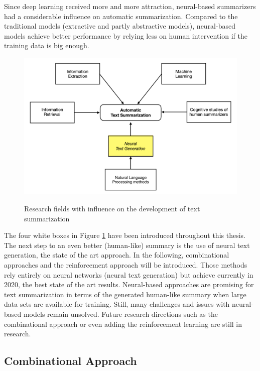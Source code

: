 Since deep learning received more and more attraction, neural-based summarizers had a considerable influence on automatic summarization. Compared to the traditional models (extractive and partly abstractive models), neural-based models achieve better performance by relying less on human intervention if the training data is big enough.

\begin{figure}
	\begin{center}
		\includegraphics[width=5.5in]{photos/summ}\\
		\caption{Research fields with influence on the development of text summarization}\label{summ}
	\end{center}
\end{figure}

The four white boxes in Figure \ref{summ} have been introduced throughout this thesis. The next step to an even better (human-like) summary is the use of neural text generation, the state of the art approach. In the following, combinational approaches and the reinforcement approach will be introduced. Those methods rely entirely on neural networks (neural text generation) but achieve currently in 2020, the best state of the art results. Neural-based approaches are promising for text summarization in terms of the generated human-like summary when large data sets are available for training. Still, many challenges and issues with neural-based models remain unsolved. Future research directions such as the combinational approach or even adding the reinforcement learning are still in research.

\subsection{Combinational Approach}\label{ss:neuralgen}

